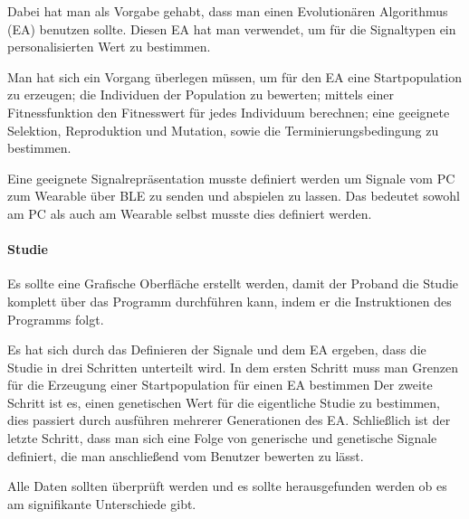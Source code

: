 Dabei hat man als Vorgabe gehabt, dass man einen Evolution{\"a}ren Algorithmus (EA) benutzen sollte.
Diesen EA hat man verwendet, um f{\"u}r die Signaltypen ein personalisierten Wert zu bestimmen.

Man hat sich ein Vorgang {\"u}berlegen m{\"u}ssen, um f{\"u}r den EA eine Startpopulation zu erzeugen; die Individuen der Population zu bewerten; mittels einer Fitnessfunktion den Fitnesswert f{\"u}r jedes Individuum berechnen; eine geeignete Selektion, Reproduktion und Mutation, sowie die Terminierungsbedingung zu bestimmen. 

Eine geeignete Signalrepr{\"a}sentation musste definiert werden um Signale vom PC zum Wearable {\"u}ber BLE zu senden und abspielen zu lassen. Das bedeutet sowohl am PC als auch am Wearable selbst musste dies definiert werden.

\paragraph{Studie}

Es sollte eine Grafische Oberfl{\"a}che erstellt werden, damit der Proband die Studie komplett {\"u}ber das Programm durchf{\"u}hren kann, indem er die Instruktionen des Programms folgt.

Es hat sich durch das Definieren der Signale und dem EA ergeben, dass die Studie in drei Schritten unterteilt wird. 
In dem ersten Schritt muss man Grenzen f{\"u}r die Erzeugung einer Startpopulation f{\"u}r einen EA bestimmen 
Der zweite Schritt ist es, einen genetischen Wert f{\"u}r die eigentliche Studie zu bestimmen, dies passiert durch ausf{\"u}hren mehrerer Generationen des EA. 
Schlie{\ss}lich ist der letzte Schritt, dass man sich eine Folge von generische und genetische Signale definiert, die man anschlie{\ss}end vom Benutzer bewerten zu l{\"a}sst.

Alle Daten sollten {\"u}berpr{\"u}ft werden und es sollte herausgefunden werden ob es am signifikante Unterschiede gibt.




